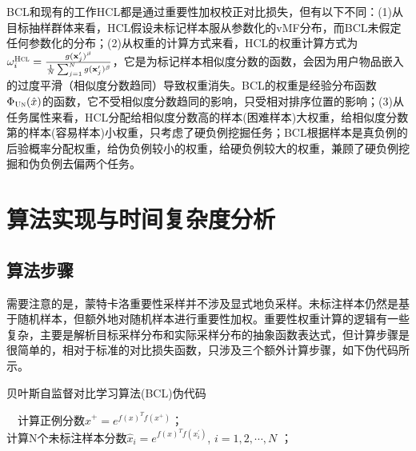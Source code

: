 BCL和现有的工作HCL\cite{Robinson:2021:ICLR}都是通过重要性加权校正对比损失，但有以下不同：(1)从目标抽样群体来看，HCL假设未标记样本服从参数化的vMF分布，而BCL未假定任何参数化的分布；(2)从权重的计算方式来看，HCL的权重计算方式为$\omega_i^\textsc{Hcl} = \frac{g(\mathbf{x}^\prime_j)^\beta}{\frac{1}{N} \sum_{j=1}^{N}g(\mathbf{x}^\prime_j)^\beta}$，它是为标记样本相似度分数的函数，会因为用户物品嵌入的过度平滑（相似度分数趋同）导致权重消失。BCL的权重是经验分布函数$\Phi_{\textsc{Un}}(\hat{x})$的函数，它不受相似度分数趋同的影响，只受相对排序位置的影响；(3)从任务属性来看，HCL分配给相似度分数高的样本(困难样本)大权重，给相似度分数第的样本(容易样本)小权重，只考虑了硬负例挖掘任务；BCL根据样本是真负例的后验概率分配权重，给伪负例较小的权重，给硬负例较大的权重，兼顾了硬负例挖掘和伪负例去偏两个任务。

\section{算法实现与时间复杂度分析}
\subsection{算法步骤}
需要注意的是，蒙特卡洛重要性采样并不涉及显式地负采样。未标注样本仍然是基于随机样本，但额外地对随机样本进行重要性加权。重要性权重计算的逻辑有一些复杂，主要是解析目标采样分布和实际采样分布的抽象函数表达式，但计算步骤是很简单的，相对于标准的对比损失函数，只涉及三个额外计算步骤，如下伪代码所示。
\begin{algorithm}[!]
	\SetAlgoLined
	\small
	\caption{贝叶斯自监督对比学习算法(BCL)伪代码}\label{5-Alg:1}
	~~计算正例分数$\hat{x}^+ = e^{f(x)^Tf(x^+)}$；\\
	计算N个未标注样本分数$\hat{x}_i = e^{f(x)^Tf(x^\prime_i)}$, $i = 1,2,\cdots, N$ ；
	
\end{algorithm}

